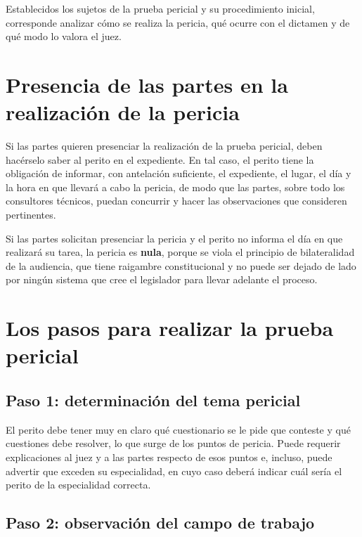 \documentclass[12pt,oneside]{book}
\begin{document}
Establecidos los sujetos de la prueba pericial y su procedimiento inicial, corresponde analizar cómo se realiza la pericia, qué ocurre con el dictamen y de qué modo lo valora el juez.


\section{Presencia de las partes en la realización de la pericia}

Si las partes quieren presenciar la realización de la prueba pericial, deben hacérselo saber al perito en el expediente. En tal caso, el perito tiene la obligación de informar, con antelación suficiente, el expediente, el lugar, el día y la hora en que llevará a cabo la pericia, de modo que las partes, sobre todo los consultores técnicos, puedan concurrir y hacer las observaciones que consideren pertinentes.

\begin{important}
Si las partes solicitan presenciar la pericia y el perito no informa el día en que realizará su tarea, la pericia es \textbf{nula}, porque se viola el principio de bilateralidad de la audiencia, que tiene raigambre constitucional y no puede ser dejado de lado por ningún sistema que cree el legislador para llevar adelante el proceso.
\end{important}

\section{Los pasos para realizar la prueba pericial}

\subsection{Paso 1: determinación del tema pericial}

El perito debe tener muy en claro qué cuestionario se le pide que conteste y qué cuestiones debe resolver, lo que surge de los puntos de pericia. Puede requerir explicaciones al juez y a las partes respecto de esos puntos e, incluso, puede advertir que exceden su especialidad, en cuyo caso deberá indicar cuál sería el perito de la especialidad correcta.

\subsection{Paso 2: observación del campo de trabajo}
\end{document}
